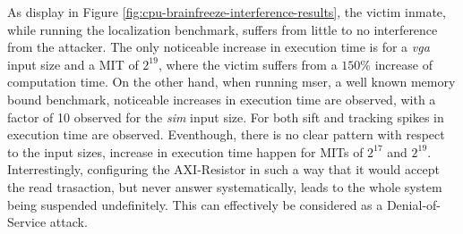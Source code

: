     As display in Figure \ref{fig:cpu-brainfreeze-interference-results}, the victim inmate, while running the localization benchmark, suffers from little to no interference from the attacker. The only noticeable increase in execution time is for a \emph{vga} input size and a MIT of $2^{19}$, where the victim suffers from a $150\%$ increase of computation time.
    On the other hand, when running mser, a well known memory bound benchmark, noticeable increases in execution time are observed, with a factor of 10 observed for the \emph{sim} input size.
    For both sift and tracking spikes in execution time are observed. Eventhough, there is no clear pattern with respect to the input sizes, increase in execution time happen for MITs of $2^{17}$ and $2^{19}$.\\

    Interrestingly, configuring the AXI-Resistor in such a way that it would accept the read trasaction, but never answer systematically, leads to the whole system being suspended undefinitely. This can effectively be considered as a Denial-of-Service attack.
